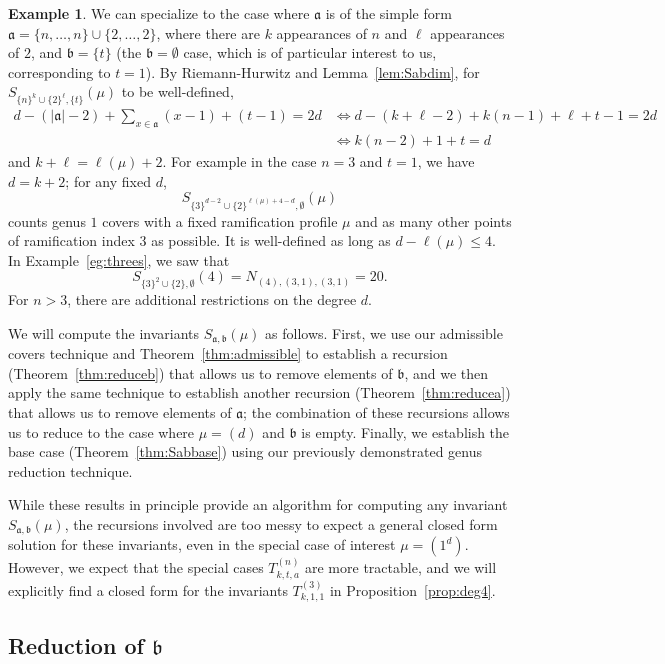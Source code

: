 \documentclass[11pt]{article}           %
\renewcommand{\a}{\mathfrak a}
\renewcommand{\b}{\mathfrak b}
\theoremstyle{definition}
\newtheorem{eg}[thm]{Example}
\begin{document}
\begin{eg}
  \label{eg:Sabns}
  We can specialize to the case where $\a$ is of the simple form
  $\a=\{n,\dots,n\}\cup\{2,\dots,2\}$, where there are $k$ appearances
  of $n$ and $\ell$ appearances of $2$, and $\b=\{t\}$ (the $\b=\emptyset$
  case, which is of particular interest to us, corresponding to $t=1$).
  By Riemann-Hurwitz and Lemma~\ref{lem:Sabdim}, for
  $S_{\{n\}^k\cup\{2\}^{\ell},\{t\}}(\mu)$ to be well-defined,
  \begin{align*}
    d-(|\a|-2)+\sum_{x\in\a}(x-1)+(t-1)=2d &\iff d-(k+\ell-2)+k(n-1)+\ell+t-1=2d \\
    &\iff k(n-2)+1+t=d
  \end{align*}
  and $k+\ell=\ell(\mu)+2$.
  For example in the case $n=3$ and $t=1$, we have $d=k+2$; for any fixed $d$,
  \[S_{\{3\}^{d-2}\cup\{2\}^{\ell(\mu)+4-d},\emptyset}(\mu)\] counts genus $1$ covers
  with a fixed ramification profile $\mu$ and as many other
  points of ramification index $3$ as possible. It is well-defined
  as long as $d-\ell(\mu)\leq 4$.
  In Example~\ref{eg:threes}, we saw that
  \[
  S_{\{3\}^2\cup\{2\},\emptyset}(4)=N_{(4),(3,1),(3,1)}=20.
  \]
  For $n>3$, there are additional
  restrictions on the degree $d$.
  \end{eg}

We will compute the invariants $S_{\a,\b}(\mu)$ as follows. First,
we use our admissible covers technique
and Theorem~\ref{thm:admissible} to establish a recursion (Theorem~\ref{thm:reduceb}) that allows us to remove elements of
$\b$, and we then apply the same
technique to establish another recursion (Theorem~\ref{thm:reducea}) that allows us to remove elements of $\a$; the combination
of these recursions allows us to reduce to the case where $\mu=(d)$ and $\b$ is empty. Finally,
we establish the base case (Theorem~\ref{thm:Sabbase}) using our previously demonstrated genus reduction technique.

While these results in principle provide an algorithm for computing any invariant
$S_{\a,\b}(\mu)$, the recursions involved are too messy to expect a general closed
form solution for these invariants,
even in the special case of interest $\mu=(1^d)$. However, we expect that the special cases
$T_{k,t,a}^{(n)}$ are more tractable, and we will explicitly find a closed form
for the invariants $T_{k,1,1}^{(3)}$ in Proposition~\ref{prop:deg4}.

\subsection{Reduction of $\b$}
\end{document}
